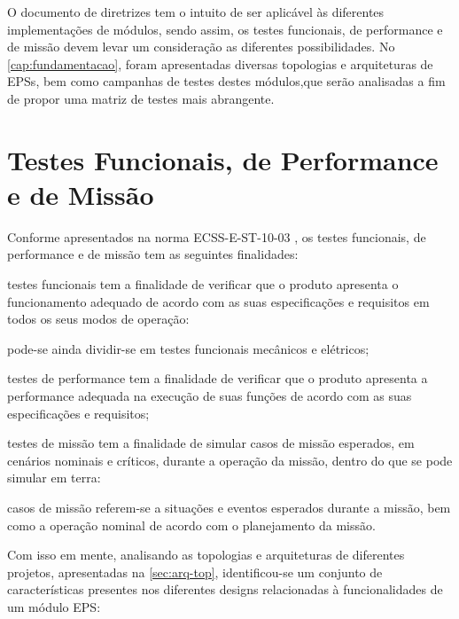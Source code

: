 O documento de diretrizes tem o intuito de ser aplicável às diferentes implementações de módulos, sendo assim, os testes funcionais, de performance e de missão devem levar um consideração as diferentes possibilidades.
No \autoref{cap:fundamentacao}, foram apresentadas diversas topologias e arquiteturas de \gls{EPS}s, bem como campanhas de testes destes módulos,que serão analisadas a fim de propor uma matriz de testes mais abrangente.


\section{Testes Funcionais, de Performance e de Missão} \label{sec:analises-testes}

Conforme apresentados na norma ECSS-E-ST-10-03 \cite{ecss-e-st-10-03}, os testes funcionais, de performance e de missão tem as seguintes finalidades:

\begin{alineas}
    \item testes funcionais tem a finalidade de verificar que o produto apresenta o funcionamento adequado de acordo com as suas especificações e requisitos em todos os seus modos de operação:
    \begin{alineas}
        \item pode-se ainda dividir-se em testes funcionais mecânicos e elétricos;
    \end{alineas}
    \item testes de performance tem a finalidade de verificar que o produto apresenta a performance adequada na execução de suas funções de acordo com as suas especificações e requisitos;
    \item testes de missão tem a finalidade de simular casos de missão esperados, em cenários nominais e críticos, durante a operação da missão, dentro do que se pode simular em terra:
    \begin{alineas}
        \item casos de missão referem-se a situações e eventos esperados durante a missão, bem como a operação nominal de acordo com o planejamento da missão.
    \end{alineas}
\end{alineas}

Com isso em mente, analisando as topologias e arquiteturas de diferentes projetos, apresentadas na \autoref{sec:arq-top}, identificou-se um conjunto de características presentes nos diferentes designs relacionadas à funcionalidades de um módulo \gls{EPS}:

